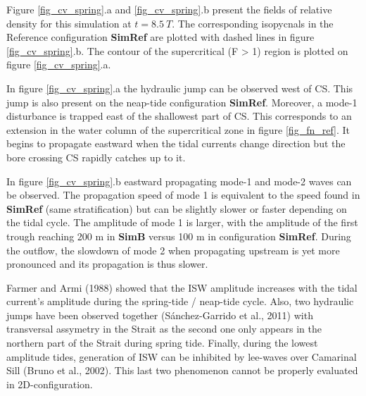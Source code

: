 Figure \ref{fig_cv_spring}.a and \ref{fig_cv_spring}.b present the fields of relative density for this simulation at $t = 8.5\ T$. The corresponding isopycnals in the Reference configuration \textbf{SimRef} are plotted with dashed lines in figure \ref{fig_cv_spring}.b. The contour of the supercritical (F > 1) region is plotted on figure \ref{fig_cv_spring}.a.

In figure \ref{fig_cv_spring}.a the hydraulic jump can be observed west of CS. This jump is also present on the neap-tide configuration \textbf{SimRef}. Moreover, a mode-1 disturbance is trapped east of the shallowest part of CS. This corresponds to an extension in the water column of the supercritical zone in figure \ref{fig_fn_ref}. It begins to propagate eastward when the tidal currents change direction but the bore crossing CS rapidly catches up to it.

In figure \ref{fig_cv_spring}.b eastward propagating mode-1 and mode-2 waves can be observed. The propagation speed of mode 1 is equivalent to the speed found in \textbf{SimRef} (same stratification) but can be slightly slower or faster depending on the tidal cycle. The amplitude of mode 1 is larger, with the amplitude of the first trough reaching 200 m in \textbf{SimB} versus 100 m in configuration \textbf{SimRef}\color{black}. During the outflow, the slowdown of mode 2 when propagating upstream is yet more pronounced and its propagation is thus slower.

Farmer and Armi (1988) showed that the ISW amplitude increases with the tidal current's amplitude during the spring-tide / neap-tide cycle. Also, two hydraulic jumps have been observed together (S\'anchez-Garrido et al., 2011) with transversal assymetry in the Strait as the second one only appears in the northern part of the Strait during spring tide. Finally, during the lowest amplitude tides, generation of ISW can be inhibited by lee-waves over Camarinal Sill (Bruno et al., 2002). This last two phenomenon cannot be properly evaluated in 2D-configuration. 

